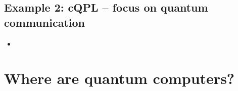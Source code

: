 \documentclass{beamer}
\begin{document}
\begin{frame}{\insertsection}{\insertsubsection}
	
\end{frame}

\begin{frame}{\insertsection}{\insertsubsection}
	
\end{frame}

\begin{frame}{\insertsection}{\insertsubsection}
	
\end{frame}


\subsection{Example 2: cQPL -- focus on quantum communication}

\begin{frame}{\insertsection}{\insertsubsection}
    \begin{itemize}
        \item<1-> 
    \end{itemize}
\end{frame}

\begin{frame}{\insertsection}{\insertsubsection}
    
\end{frame}

\begin{frame}{\insertsection}{\insertsubsection}
    
\end{frame}

\section{Where are quantum computers?}
\end{document}
